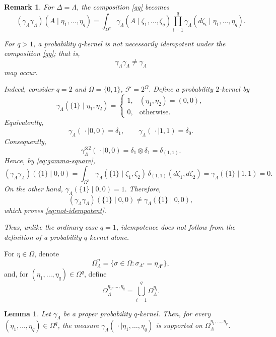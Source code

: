 \documentclass[11pt,reqno]{amsart}
\newtheorem{lemma}{Lemma}
\newtheorem{rk}{Remark}
\numberwithin{equation}{section} \setcounter{tocdepth}{1}
\begin{document}
\begin{rk}\label{ggg}
	For $\Delta=\Lambda$, the composition \eqref{gg} becomes
	\begin{equation}\label{eq:gamma-square}
		(\gamma_\Lambda\gamma_\Lambda)
		(A\mid\eta_1,\ldots,\eta_q)
		=
		\int_{\Omega^q}
		\gamma_\Lambda(A\mid\zeta_1,\ldots,\zeta_q)
		\prod_{i=1}^q
		\gamma_\Lambda(d\zeta_i\mid\eta_1,\ldots,\eta_q).
	\end{equation}
	
	For $q>1$, a probability $q$-kernel is not necessarily idempotent under
	the composition \eqref{gg}; that is,
	\begin{equation}\label{eq:not-idempotent}
		\gamma_\Lambda\gamma_\Lambda
		\neq
		\gamma_\Lambda
	\end{equation}
	may occur.
	
	Indeed, consider $q=2$ and $\Omega=\{0,1\}$, $\mathcal F=2^\Omega.$
	Define a probability $2$-kernel by
	\begin{equation}\label{eq:counterexample-kernel}
		\gamma_\Lambda(\{1\}\mid\eta_1,\eta_2)
		=
		\begin{cases}
			1,&(\eta_1,\eta_2)=(0,0),\\[1mm]
			0,&\text{otherwise}.
		\end{cases}
	\end{equation}
	Equivalently,
	\[
	\gamma_\Lambda(\,\cdot\mid0,0)=\delta_1,
	\qquad
	\gamma_\Lambda(\,\cdot\mid1,1)=\delta_0.
	\]
	Consequently,
	\[
	\gamma_\Lambda^{\otimes2}
	(\,\cdot\mid0,0)
	=
	\delta_1\otimes\delta_1
	=
	\delta_{(1,1)}.
	\]
	Hence, by \eqref{eq:gamma-square},
	\[
			(\gamma_\Lambda\gamma_\Lambda)
		(\{1\}\mid0,0)
		=
		\int_{\Omega^2}
		\gamma_\Lambda(\{1\}\mid\zeta_1,\zeta_2)
		\,\delta_{(1,1)}(d\zeta_1,d\zeta_2)
		=
		\gamma_\Lambda(\{1\}\mid1,1)=
		0.
		\]
	On the other hand, $
	\gamma_\Lambda(\{1\}\mid0,0)=1.
	$
	Therefore,
	\[
	(\gamma_\Lambda\gamma_\Lambda)(\{1\}\mid0,0)
	\neq
	\gamma_\Lambda(\{1\}\mid0,0),
	\]
	which proves \eqref{eq:not-idempotent}.
	
	Thus, unlike the ordinary case $q=1$, idempotence does not follow from
	the definition of a probability $q$-kernel alone.
\end{rk}

For $\eta\in\Omega$, denote
\[
\Omega_\Lambda^\eta
=
\{\sigma\in\Omega:
\sigma_{\Lambda^c}=\eta_{\Lambda^c}\},
\]
and, for
$(\eta_1,\ldots,\eta_q)\in\Omega^q$, define
\[
\Omega_\Lambda^{\eta_1,\ldots,\eta_q}
=
\bigcup_{i=1}^q
\Omega_\Lambda^{\eta_i}.
\]

\begin{lemma}\label{sup}
	Let $\gamma_\Lambda$ be a proper probability $q$-kernel. Then, for
	every $(\eta_1,\ldots,\eta_q)\in\Omega^q$, the measure $
	\gamma_\Lambda(\,\cdot\mid\eta_1,\ldots,\eta_q)$
	is supported on
	$\Omega_\Lambda^{\eta_1,\ldots,\eta_q}$.
\end{lemma}
\end{document}

